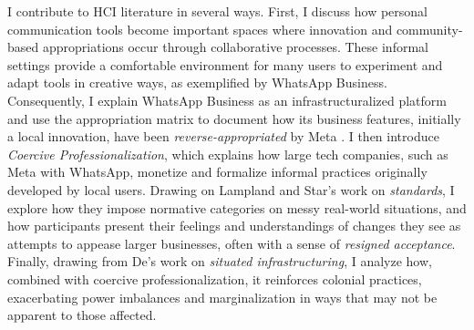 I contribute to HCI literature in several ways. First, I discuss how personal communication tools become important spaces where innovation and community-based appropriations occur through collaborative processes. These informal settings provide a comfortable environment for many users to experiment and adapt tools in creative ways, as exemplified by WhatsApp Business. Consequently, I explain WhatsApp Business as an infrastructuralized platform \cite{doi:10.1177/1461444816661553} and use the appropriation matrix \cite{10.1145/3613904.3642590} to document how its business features, initially a local innovation, have been \textit{reverse-appropriated} by Meta \cite{10.1145/3613904.3642590}. I then introduce \textit{Coercive Professionalization}, which explains how large tech companies, such as Meta with WhatsApp, monetize and formalize informal practices originally developed by local users. Drawing on Lampland and Star's \cite{lampland2009standards} work on \textit{standards}, I explore how they impose normative categories on messy real-world situations, and how participants present their feelings and understandings of changes they see as attempts to appease larger businesses, often with a sense of \textit{resigned acceptance}. Finally, drawing from De's \cite{10.1145/3613905.3651034} work on \textit{situated infrastructuring}, I analyze how, combined with coercive professionalization, it reinforces colonial practices, exacerbating power imbalances and marginalization in ways that may not be apparent to those affected.











 

















































 












